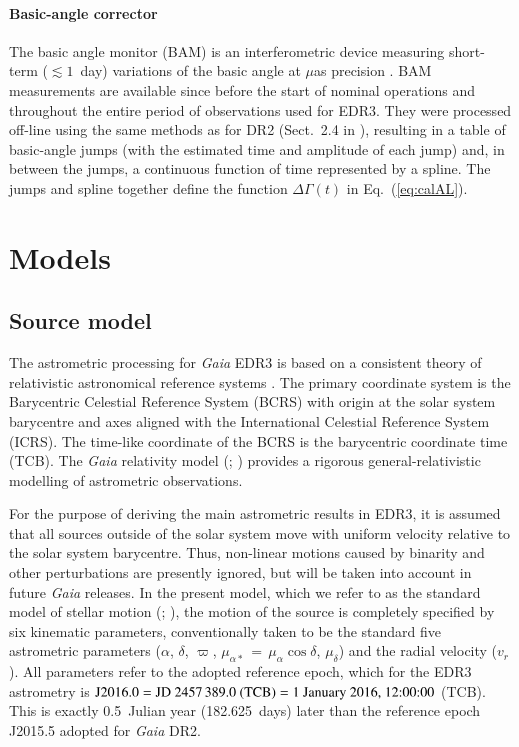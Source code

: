 \documentclass[longauth]{aa} %
\begin{document}
\paragraph{Basic-angle corrector} 
The basic angle monitor (BAM) is an interferometric device measuring short-term
($\lesssim 1$~day) variations of the basic angle at $\mu$as precision 
. BAM measurements are available since before the start of
nominal operations and throughout the entire period of observations used for EDR3. They
were processed off-line using the same methods as for DR2 
(Sect.~2.4 in ), resulting in a table of basic-angle
jumps (with the estimated time and amplitude of each jump) and, in between the jumps, 
a continuous function of time represented by a spline. 
The jumps and spline together define the function $\Delta\Gamma(t)$ in Eq.~(\ref{eq:calAL}).

\section{Models}
\label{sec:models}

\subsection{Source model}
\label{sec:source}

The astrometric processing for \textit{Gaia} EDR3 is based on a consistent 
theory of relativistic astronomical reference systems . 
The primary coordinate system is the Barycentric Celestial Reference System 
(BCRS) with origin at the solar system barycentre and axes aligned with the 
International Celestial Reference System (ICRS). The time-like coordinate of 
the BCRS is the barycentric coordinate time (TCB). The
\textit{Gaia} relativity model (; )
provides a rigorous general-relativistic modelling of astrometric observations.

For the purpose of deriving the main astrometric results in EDR3, it is assumed that
all sources outside of the solar system move with uniform velocity relative to the solar 
system barycentre. Thus, non-linear motions caused by binarity and other perturbations 
are presently ignored, but will be taken into account in future \textit{Gaia} releases.
In the present model, which we refer to as the standard model of stellar motion 
(; ), the motion of the source is 
completely specified by six kinematic
parameters, conventionally taken to be the standard five astrometric parameters
($\alpha$, $\delta$, $\varpi$, $\mu_{\alpha*}{\,=\,}\mu_\alpha\cos\delta$, $\mu_\delta$)
and the radial velocity ($v_r$). All parameters refer to the adopted reference epoch, 
which for the EDR3 astrometry is
$\text{J2016.0}=\text{JD~2457\,389.0 (TCB)}=\text{1 January 2016, 12:00:00}$ (TCB).
This is exactly 0.5~Julian year (182.625~days) later than the reference epoch 
J2015.5 adopted for \textit{Gaia} DR2.
\end{document}

